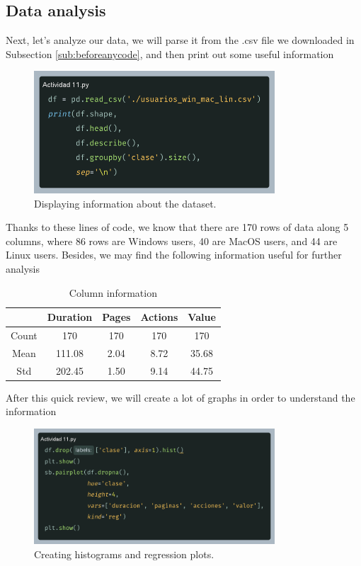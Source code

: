 \documentclass[10pt]{article}
\begin{document}
\subsection{Data analysis}
Next, let's analyze our data, we will parse it from the .csv file we downloaded in Subsection \ref{sub:beforeanycode}, and then print out some useful information \par
\begin{figure}[h]
  \centering
  \includegraphics[width=90mm]{./images/2025-03-28-08-59-30.png}
  \caption{Displaying information about the dataset.}
  \label{fig:data_info}
\end{figure}
Thanks to these lines of code, we know that there are 170 rows of data along 5 columns, where 86 rows are Windows users, 40 are MacOS users, and 44 are Linux users. Besides, we may find the following information useful for further analysis \par
\begin{table}[!ht]
  \centering
  \caption{Column information}
  \label{tbl:col_info}
    \begin{tabular}{|c|c|c|c|c|}
      \hline
       & Duration & Pages & Actions & Value \\
      \hline
      Count & 170 & 170 & 170 & 170 \\
      \hline
      Mean & 111.08 & 2.04 & 8.72 & 35.68 \\
      \hline
      Std & 202.45 & 1.50 & 9.14 & 44.75 \\
      \hline
    \end{tabular}
\end{table}
\newpage
After this quick review, we will create a lot of graphs in order to understand the information \par
\begin{figure}[h]
  \centering
  \includegraphics[width=90mm]{./images/2025-03-28-09-56-00.png}
  \caption{Creating histograms and regression plots.}
\end{figure}
\end{document}
